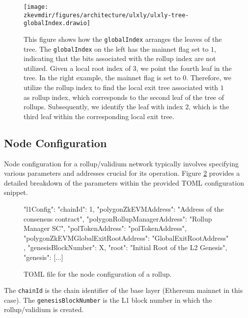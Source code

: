 \begin{figure}[h]
\centering
\texttt{[image: \\zkevmdir/figures/architecture/ulxly/ulxly-tree-globalIndex.drawio]}
\caption{This figure shows how the \texttt{globalIndex} arranges the leaves of
the tree. The \texttt{globalIndex} on the left has the mainnet flag set to $1$,
indicating that the bits associated with the rollup index are not utilized.
Given a local root index of $3$, we point the fourth leaf in the tree. In the
right example, the mainnet flag is set to $0$. Therefore, we utilize the rollup
index to find the local exit tree associated with $1$ as rollup index, which
corresponds to the second leaf of the tree of rollups. Subsequently, we
identify the leaf with index $2$, which is the third leaf within the
corresponding local exit tree. }
\label{fig:global-index}
\end{figure}










\subsection{Node Configuration}

Node configuration for a rollup/validium network typically involves specifying various parameters and addresses crucial for its operation. Figure \ref{fig:node-config} provides a detailed breakdown of the parameters within the provided TOML configuration snippet.

\vspace{1em}

\begin{figure}[H]
\centering
\begin{toml}
{
    "l1Config": {
        "chainId": 1,
        "polygonZkEVMAddress": "Address of the consensus contract",
        "polygonRollupManagerAddress": "Rollup Manager SC",
        "polTokenAddress": "polTokenAddress",
        "polygonZkEVMGlobalExitRootAddress": "GlobalExitRootAddress"
    },
    "genesisBlockNumber": X,
    "root": "Initial Root of the L2 Genesis",
    "genesis": [...]
}
\end{toml}
\caption{TOML file for the node configuration of a rollup. }
\label{fig:node-config}
\end{figure}


The \texttt{chainId} is the chain identifier of the base layer (Ethereum mainnet in this case). The \texttt{genesisBlockNumber} is the L1 block number in which the rollup/validium is created.







